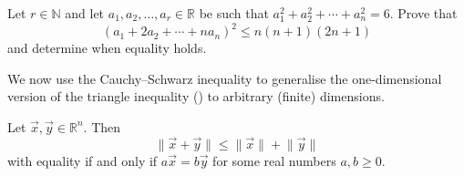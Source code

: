 \begin{exercise}
Let $r \in \mathbb{N}$ and let $a_1,a_2,\dots,a_r \in \mathbb{R}$ be such that $a_1^2+a_2^2+\cdots+a_n^2=6$. Prove that
\[ (a_1+2a_2+\cdots+na_n)^2 \le n(n+1)(2n+1) \]
and determine when equality holds.
\end{exercise}

We now use the Cauchy--Schwarz inequality to generalise the one-dimensional version of the triangle inequality () to arbitrary (finite) dimensions.

\begin{theorem}
\label{thmTriangleInequality}
Let $\vec x, \vec y \in \mathbb{R}^n$. Then
\[ \lVert \vec x + \vec y \rVert \le \lVert \vec x \rVert + \lVert \vec y \rVert \]
with equality if and only if $a\vec x = b\vec y$ for some real numbers $a,b \ge 0$.
\end{theorem}

